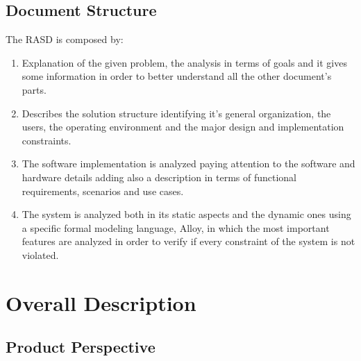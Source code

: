 \documentclass[a4paper]{article}
\begin{document}
    \subsection{Document Structure}
    The RASD is composed by:
    \begin{enumerate}
        \item Explanation of the given problem, the analysis in terms of goals and it gives some information in order to better understand all the other document's parts.
        \item Describes the solution structure identifying it's general organization, the users, the operating environment and the major design and implementation constraints.
        \item The software implementation is analyzed paying attention to the software and hardware details adding also a description in terms of functional requirements, scenarios and use cases.
        \item The system is analyzed both in its static aspects and the dynamic ones using a specific formal modeling language, Alloy, in which the most important features are analyzed in order to verify if every constraint of the system is not violated.
    \end{enumerate}
    
    \section{Overall Description}
    
    \subsection{Product Perspective}
    
\end{document}
